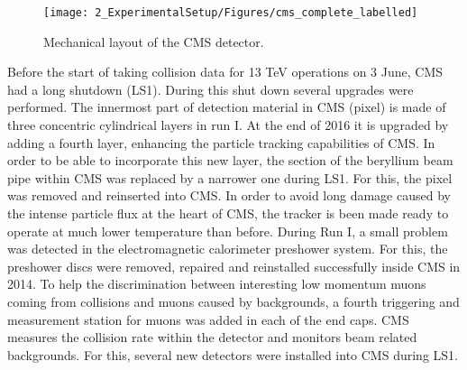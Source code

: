 \begin{figure}[htbp]
	\centering
	\texttt{[image: 2\_ExperimentalSetup/Figures/cms\_complete\_labelled]}
	\caption{Mechanical layout of the CMS detector\cite{CMSdraw}.}
	\label{fig:CMS}
\end{figure}

Before the start of taking collision data for 13 \si{ \TeV} operations on 3 June, CMS had a long shutdown (LS1)\cite{Pralavorio:2024977}. During this shut down several upgrades were performed. The innermost part of detection material in CMS (pixel) is made of three concentric cylindrical layers in run I. At the end of 2016 it is upgraded by adding a fourth layer, enhancing the particle tracking capabilities of CMS. In order to be able to incorporate this new layer, the section of the beryllium beam pipe within CMS was replaced by a narrower one during LS1. For this, the pixel was removed and reinserted into CMS.  In order to avoid long damage caused by the intense particle flux at the heart of CMS, the tracker is been made ready to operate at much lower temperature than before. During Run I, a small problem was detected in the electromagnetic calorimeter preshower system. For this, the preshower discs were removed, repaired and reinstalled successfully inside CMS in 2014. To help the discrimination between interesting low momentum muons coming from collisions and muons caused by backgrounds, a fourth triggering and measurement station for muons was added in each of the end caps.  CMS measures the collision rate within the detector and monitors beam related backgrounds. For this, several new detectors were installed into CMS during LS1. 



